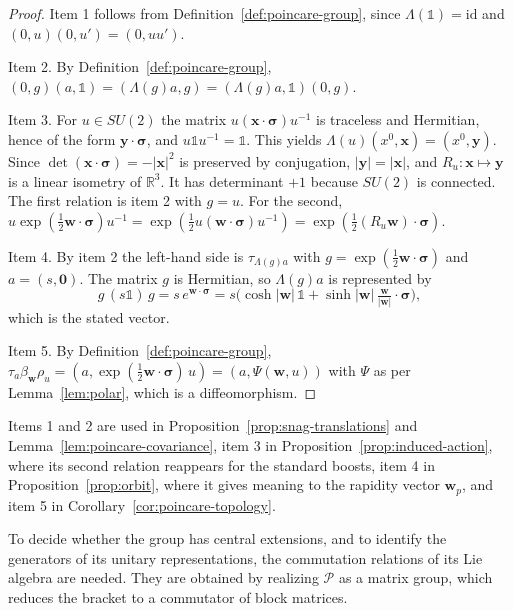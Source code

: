\begin{proof}
	Item 1 follows from Definition~\ref{def:poincare-group}, since $\Lambda(\mathbb{1})=\mathrm{id}$ and $(0,u)(0,u')=(0,uu')$.
	
	Item 2. By Definition~\ref{def:poincare-group}, $(0,g)(a,\mathbb{1})=(\Lambda(g)a,g)=(\Lambda(g)a,\mathbb{1})(0,g)$.
	
	Item 3. For $u\in SU(2)$ the matrix $u(\mathbf{x}\cdot\boldsymbol{\sigma})u^{-1}$ is traceless and Hermitian, hence of the form $\mathbf{y}\cdot\boldsymbol{\sigma}$, and $u\mathbb{1}u^{-1}=\mathbb{1}$. This yields $\Lambda(u)(x^0,\mathbf{x})=(x^0,\mathbf{y})$. Since $\det(\mathbf{x}\cdot\boldsymbol{\sigma})=-|\mathbf{x}|^2$ is preserved by conjugation, $|\mathbf{y}|=|\mathbf{x}|$, and $R_u:\mathbf{x}\mapsto\mathbf{y}$ is a linear isometry of $\mathbb{R}^3$. It has determinant $+1$ because $SU(2)$ is connected. The first relation is item 2 with $g=u$. For the second, $u\exp(\tfrac12\mathbf{w}\cdot\boldsymbol{\sigma})u^{-1}=\exp(\tfrac12u(\mathbf{w}\cdot\boldsymbol{\sigma})u^{-1})=\exp(\tfrac12(R_u\mathbf{w})\cdot\boldsymbol{\sigma})$.
	
	Item 4. By item 2 the left-hand side is $\tau_{\Lambda(g)a}$ with $g=\exp(\tfrac12\mathbf{w}\cdot\boldsymbol{\sigma})$ and $a=(s,\mathbf{0})$. The matrix $g$ is Hermitian, so $\Lambda(g)a$ is represented by
	\begin{equation*}
		g\,(s\mathbb{1})\,g=s\,e^{\mathbf{w}\cdot\boldsymbol{\sigma}}=s\Big(\cosh|\mathbf{w}|\,\mathbb{1}+\sinh|\mathbf{w}|\,\tfrac{\mathbf{w}}{|\mathbf{w}|}\cdot\boldsymbol{\sigma}\Big),
	\end{equation*}
	which is the stated vector.
	
	Item 5. By Definition~\ref{def:poincare-group}, $\tau_a\beta_{\mathbf{w}}\rho_u=(a,\exp(\tfrac12\mathbf{w}\cdot\boldsymbol{\sigma})\,u)=(a,\Psi(\mathbf{w},u))$ with $\Psi$ as per Lemma~\ref{lem:polar}, which is a diffeomorphism.
\end{proof}

\noindent Items 1 and 2 are used in Proposition~\ref{prop:snag-translations} and Lemma~\ref{lem:poincare-covariance}, item 3 in Proposition~\ref{prop:induced-action}, where its second relation reappears for the standard boosts, item 4 in Proposition~\ref{prop:orbit}, where it gives meaning to the rapidity vector $\mathbf{w}_p$, and item 5 in Corollary~\ref{cor:poincare-topology}.

To decide whether the group has central extensions, and to identify the generators of its unitary representations, the commutation relations of its Lie algebra are needed. They are obtained by realizing $\mathcal{P}$ as a matrix group, which reduces the bracket to a commutator of block matrices.


